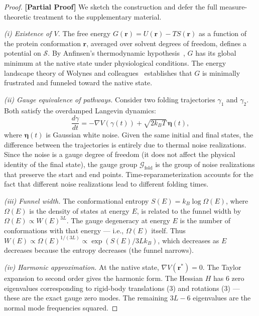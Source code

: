 \documentclass[12pt,a4paper]{article}
\theoremstyle{remark}
\newcommand{\G}{\mathcal{G}}
\newcommand{\Sstruct}{\mathcal{S}}
\newcommand{\rigorPartial}{\textbf{[Partial Proof]}}
\begin{document}
\begin{proof}
\rigorPartial
We sketch the construction and defer the full measure-theoretic treatment to the supplementary material.

\medskip\noindent\textit{(i) Existence of $V$.}
The free energy $G(\mathbf{r}) = U(\mathbf{r}) - T S(\mathbf{r})$ as a function of the protein conformation $\mathbf{r}$, averaged over solvent degrees of freedom, defines a potential on $\Sstruct$.
By Anfinsen's thermodynamic hypothesis~\cite{anfinsen1973principles}, $G$ has its global minimum at the native state under physiological conditions.
The energy landscape theory of Wolynes and colleagues~\cite{wolynes2012energy} establishes that $G$ is minimally frustrated and funneled toward the native state.

\medskip\noindent\textit{(ii) Gauge equivalence of pathways.}
Consider two folding trajectories $\gamma_1$ and $\gamma_2$.
Both satisfy the overdamped Langevin dynamics:
\begin{equation}
    \frac{d\gamma}{dt} = -\nabla V(\gamma(t)) + \sqrt{2k_B T} \, \bm{\eta}(t),
\end{equation}
where $\bm{\eta}(t)$ is Gaussian white noise.
Given the same initial and final states, the difference between the trajectories is entirely due to thermal noise realizations.
Since the noise is a gauge degree of freedom (it does not affect the physical identity of the final state), the gauge group $\G_{\text{fold}}$ is the group of noise realizations that preserve the start and end points.
Time-reparameterization accounts for the fact that different noise realizations lead to different folding times.

\medskip\noindent\textit{(iii) Funnel width.}
The conformational entropy $S(E) = k_B \log \Omega(E)$, where $\Omega(E)$ is the density of states at energy $E$, is related to the funnel width by $\Omega(E) \propto W(E)^{3L}$.
The gauge degeneracy at energy $E$ is the number of conformations with that energy — i.e., $\Omega(E)$ itself.
Thus $W(E) \propto \Omega(E)^{1/(3L)} \propto \exp(S(E) / 3L k_B)$, which decreases as $E$ decreases because the entropy decreases (the funnel narrows).

\medskip\noindent\textit{(iv) Harmonic approximation.}
At the native state, $\nabla V(\mathbf{r}^*) = 0$.
The Taylor expansion to second order gives the harmonic form.
The Hessian $H$ has $6$ zero eigenvalues corresponding to rigid-body translations (3) and rotations (3) — these are the exact gauge zero modes.
The remaining $3L-6$ eigenvalues are the normal mode frequencies squared.
\end{proof}
\end{document}

